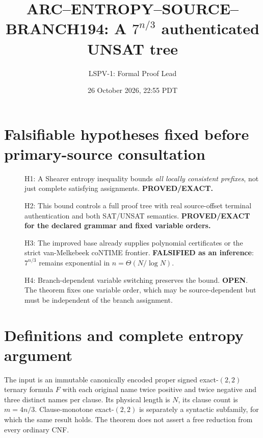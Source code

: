 \documentclass[11pt]{article}
\title{ARC--ENTROPY--SOURCE--BRANCH194: A $7^{n/3}$ authenticated UNSAT tree}
\author{LSPV-1: Formal Proof Lead}
\date{26 October 2026, 22:55 PDT}
\begin{document}
\maketitle

\noindent{}

\section{Falsifiable hypotheses fixed before primary-source consultation}
\begin{description}
\item[] H1: A Shearer entropy inequality bounds \emph{all locally consistent
prefixes}, not just complete satisfying assignments. \textbf{PROVED/EXACT.}
\item[] H2: This bound controls a full proof tree with real source-offset
terminal authentication and both SAT/UNSAT semantics. \textbf{PROVED/EXACT
for the declared grammar and fixed variable orders.}
\item[] H3: The improved base already supplies polynomial certificates or
the strict van-Melkebeek coNTIME frontier. \textbf{FALSIFIED as an
inference}: $7^{n/3}$ remains exponential in $n=\Theta(N/\log N)$.
\item[] H4: Branch-dependent variable switching preserves the bound.
\textbf{OPEN}. The theorem fixes one variable order, which may be
source-dependent but must be independent of the branch assignment.
\end{description}

\section{Definitions and complete entropy argument}
The input is an immutable canonically encoded proper signed exact-$(2,2)$
ternary formula $F$ with each original name twice positive and twice
negative and three distinct names per clause. Its physical length is $N$,
its clause count is $m=4n/3$. Clause-monotone exact-$(2,2)$ is separately
a syntactic subfamily, for which the same result holds. The theorem
does not assert a free reduction from every ordinary CNF.
\end{document}
